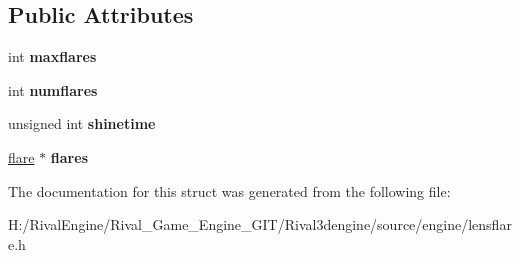 \subsection*{Public Attributes}
\begin{DoxyCompactItemize}
\item 
\mbox{\label{structflarerenderer_a6cc2764f704fa0e83256434bd12de3d1}} 
int {\bfseries maxflares}
\item 
\mbox{\label{structflarerenderer_aa3d46257da2cc518f173e95af9c14970}} 
int {\bfseries numflares}
\item 
\mbox{\label{structflarerenderer_ada2be781832a25529330a75c151f42f3}} 
unsigned int {\bfseries shinetime}
\item 
\mbox{\label{structflarerenderer_af19c40c54dfc00415be611c8419d61e4}} 
\hyperlink{structflare}{flare} $\ast$ {\bfseries flares}
\end{DoxyCompactItemize}


The documentation for this struct was generated from the following file\+:\begin{DoxyCompactItemize}
\item 
H\+:/\+Rival\+Engine/\+Rival\+\_\+\+Game\+\_\+\+Engine\+\_\+\+G\+I\+T/\+Rival3dengine/source/engine/lensflare.\+h\end{DoxyCompactItemize}

